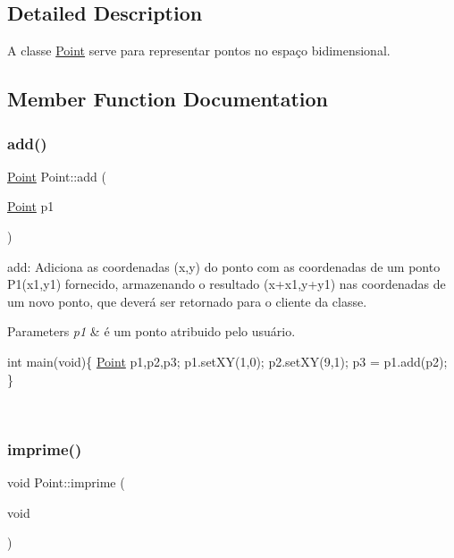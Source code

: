 \subsection{Detailed Description}
A classe \mbox{\hyperlink{class_point}{Point}} serve para representar pontos no espaço bidimensional. 

\subsection{Member Function Documentation}
\mbox{\label{class_point_a9dbea84b07b0a8ec3bbb9e58b3d15899}} 
\subsubsection{\texorpdfstring{add()}{add()}}
{\footnotesize\ttfamily \mbox{\hyperlink{class_point}{Point}} Point\+::add (\begin{DoxyParamCaption}\item[{\mbox{\hyperlink{class_point}{Point}}}]{p1 }\end{DoxyParamCaption})}



add\+: Adiciona as coordenadas (x,y) do ponto com as coordenadas de um ponto P1(x1,y1) fornecido, armazenando o resultado (x+x1,y+y1) nas coordenadas de um novo ponto, que deverá ser retornado para o cliente da classe. 


\begin{DoxyParams}{Parameters}
{\em p1} & é um ponto atribuido pelo usuário. 
\begin{DoxyPre}
int main(void)\{
   \mbox{\hyperlink{class_point}{Point}} p1,p2,p3;
   p1.setXY(1,0);
   p2.setXY(9,1);
   p3 = p1.add(p2);
\}
\end{DoxyPre}
 \\
\hline
\end{DoxyParams}
\mbox{\label{class_point_a188350fb70e5b297a659a31ab8887ca3}} 
\subsubsection{\texorpdfstring{imprime()}{imprime()}}
{\footnotesize\ttfamily void Point\+::imprime (\begin{DoxyParamCaption}\item[{void}]{ }\end{DoxyParamCaption})}



